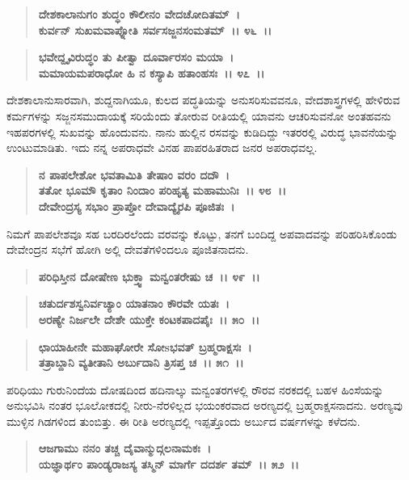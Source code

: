 \begin{verse}
\textbf{ದೇಶಕಾಲಾನುಗಂ ಶುದ್ಧಂ ಕೌಲೀನಂ ವೇದಚೋದಿತಮ್~।}\\\textbf{ಕುರ್ವನ್ ಸುಖಮವಾಪ್ನೋತಿ ಸರ್ವಸಜ್ಜನಸಂಮತಮ್~।। ೪೬~।। }
\end{verse}

\begin{verse}
\textbf{ಭವೇದ್ದೃವಿರುದ್ಧಂ ತು ಪೀತ್ವಾ ದೂರ್ವಾರಸಂ ಮಯಾ~।}\\\textbf{ಮಮಾಯಮಪರಾಧೋ ಹಿ ನ ಕಸ್ಯಾಪಿ ಹತಾಂಹಸಃ~।। ೪೭~।।}
\end{verse}

ದೇಶಕಾಲಾನುಸಾರವಾಗಿ, ಶುದ್ದನಾಗಿಯೂ, ಕುಲದ ಪದ್ಧತಿಯನ್ನು ಅನುಸರಿಸುವವನೂ, ವೇದಶಾಸ್ತ್ರಗಳಲ್ಲಿ ಹೇಳಿರುವ ಕರ್ಮಗಳನ್ನು ಸಜ್ಜನಸಮುದಾಯಕ್ಕೆ ಸರಿಯೆಂದು ತೋರುವ ರೀತಿಯಲ್ಲಿ ಯಾವನು ಆಚರಿಸುವನೋ ಅಂತಹವನು ಇಹಪರಗಳಲ್ಲಿ ಸುಖವನ್ನು ಹೊಂದುವನು. ನಾನು ಹುಲ್ಲಿನ ರಸವನ್ನು ಕುಡಿದಿದ್ದು ಇತರರಲ್ಲಿ ವಿರುದ್ಧ ಭಾವನೆಯನ್ನು ಉಂಟುಮಾಡಿತು. ಇದು ನನ್ನ ಅಪರಾಧವೇ ವಿನಹ ಪಾಪರಹಿತರಾದ ಜನರ ಅಪರಾಧವಲ್ಲ.

\begin{verse}
\textbf{ನ ಪಾಪಲೇಶೋ ಭವತಾಮಿತಿ ತೇಷಾಂ ವರಂ ದದೌ~।}\\\textbf{ತತೋ ಭೂಮೌ ಕೃತಾಂ ನಿಂದಾಂ ಪರಿಹೃತ್ಯ ಮಹಾಮುನಿಃ~।। ೪೮~।।}\\\textbf{ದೇವೇಂದ್ರಸ್ಯ ಸಭಾಂ ಪ್ರಾಪ್ತೋ ದೇವಾದ್ಯೈರಪಿ ಪೂಜಿತಃ~।}
\end{verse}

ನಿಮಗೆ ಪಾಪಲೇಶವೂ ಸಹ ಬರದಿರಲೆಂದು ವರವನ್ನು ಕೊಟ್ಟು, ತನಗೆ ಬಂದಿದ್ದ ಅಪವಾದವನ್ನು ಪರಿಹರಿಸಿಕೊಂಡು ದೇವೇಂದ್ರನ ಸಭೆಗೆ ಹೋಗಿ ಅಲ್ಲಿ ದೇವತೆಗಳಿಂದಲೂ ಪೂಜಿತನಾದನು.

\begin{verse}
\textbf{ಪರಿಧಿಸ್ತೀನ ದೋಷೇಣ ಭುಕ್ತ್ವಾ ಮನ್ವಂತರೇಷು ಚ~।। ೪೯~।।}
\end{verse}

\begin{verse}
\textbf{ಚತುರ್ದಶಸ್ವನಿರ್ವಚ್ಯಾಂ ಯಾತನಾಂ ಕೌರವೇ ಯತಃ~।}\\\textbf{ಅರಣ್ಯೇ ನಿರ್ಜಲೇ ದೇಶೇ ಯುಕ್ತೇ ಕಂಟಕಪಾದಪೈಃ~।। ೫೦~।।}
\end{verse}

\begin{verse}
\textbf{ಛಾಯಾಹೀನೇ ಮಹಾಘೋರೇ ಸೋsಭವತ್ ಬ್ರಹ್ಮರಾಕ್ಷಸಃ~।}\\\textbf{ತತ್ರಾಬ್ದಾನಿ ವ್ಯತೀತಾನಿ ಅರ್ಬುದಾನಿ ತ್ರಿಸಪ್ತ ಚ~।। ೫೧~।।}
\end{verse}

ಪರಿಧಿಯು ಗುರುನಿಂದೆಯ ದೋಷದಿಂದ ಹದಿನಾಲ್ಕು ಮನ್ವಂತರಗಳಲ್ಲಿ ರೌರವ ನರಕದಲ್ಲಿ ಬಹಳ ಹಿಂಸೆಯನ್ನು ಅನುಭವಿಸಿ ನಂತರ ಭೂಲೋಕದಲ್ಲಿ ನೀರು-ನೆರಳಿಲ್ಲದ ಭಯಂಕರವಾದ ಅರಣ್ಯದಲ್ಲಿ ಬ್ರಹ್ಮರಾಕ್ಷಸನಾದನು. ಅರಣ್ಯವು ಮುಳ್ಳಿನ ಗಿಡಗಳಿಂದ ತುಂಬಿತ್ತು. ಈ ರೀತಿ ಅರಣ್ಯದಲ್ಲಿ ಇಪ್ಪತ್ತೊಂದು ಅರ್ಬುದ ವರ್ಷಗಳನ್ನು ಕಳೆದನು.

\begin{verse}
\textbf{ಆಜಗಾಮು ನನಂ ತಚ್ಚ ದೈವಾನ್ಮುದ್ಗಲನಾಮಕಃ~।}\\\textbf{ಯಜ್ಞಾರ್ಥಂ ಪಾಂಡ್ಯರಾಜಸ್ಯ ತಸ್ಮಿನ್ ಮಾರ್ಗೆ ದದರ್ಶ ತಮ್~।। ೫೨~।। }
\end{verse}


